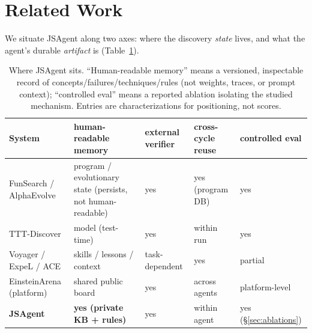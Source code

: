 \documentclass[11pt]{article}
\begin{document}
\section{Related Work}
\label{sec:related}

We situate JSAgent along two axes: where the discovery \emph{state} lives, and what the
agent's durable \emph{artifact} is (Table~\ref{tab:related}).

\begin{table}[htbp]
\centering\small
\caption{Where JSAgent sits. ``Human-readable memory'' means a versioned, inspectable record
  of concepts/failures/techniques/rules (not weights, traces, or prompt context); ``controlled
  eval'' means a reported ablation isolating the studied mechanism. Entries are characterizations
  for positioning, not scores.}
\label{tab:related}
\setlength{\tabcolsep}{4pt}
\renewcommand{\arraystretch}{1.25}
\begin{tabularx}{\textwidth}{@{}%
  >{\raggedright\arraybackslash}p{2.7cm}%
  >{\hsize=1.5\hsize\raggedright\arraybackslash}X%
  >{\hsize=0.8333\hsize\centering\arraybackslash}X%
  >{\hsize=0.8333\hsize\centering\arraybackslash}X%
  >{\hsize=0.8333\hsize\centering\arraybackslash}X@{}}
\toprule
\textbf{System} & \textbf{human-readable memory} & \textbf{external verifier} & \textbf{cross-cycle reuse} & \textbf{controlled eval} \\
\midrule
FunSearch / AlphaEvolve & program / evolutionary state (persists, not human-readable) & yes & yes (program DB) & yes \\
TTT-Discover & model (test-time) & yes & within run & yes \\
Voyager / ExpeL / ACE & skills / lessons / context & task-dependent & yes & partial \\
EinsteinArena (platform) & shared public board & yes & across agents & platform-level \\
\textbf{JSAgent} & \textbf{yes (private KB + rules)} & yes & within agent & yes (\S\ref{sec:ablations}) \\
\bottomrule
\end{tabularx}
\end{table}
\end{document}

